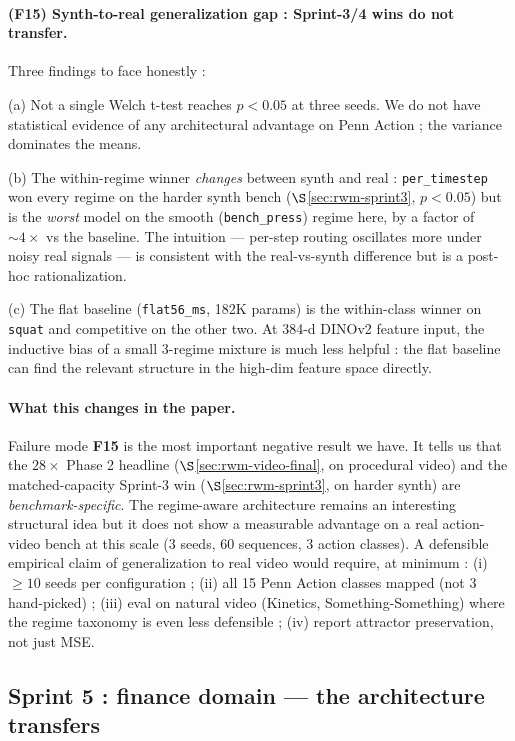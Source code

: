 \documentclass[11pt,a4paper]{article}
\begin{document}
\paragraph{(F15) Synth-to-real generalization gap : Sprint-3/4 wins
do not transfer.} Three findings to face honestly :

(a) Not a single Welch t-test reaches $p{<}0.05$ at three seeds. We
do not have statistical evidence of any architectural advantage on
Penn Action ; the variance dominates the means.

(b) The within-regime winner \emph{changes} between synth and real :
\texttt{per\_timestep} won every regime on the harder synth bench
($\S$\ref{sec:rwm-sprint3}, $p{<}0.05$) but is the \emph{worst} model
on the smooth (\texttt{bench\_press}) regime here, by a factor of
$\sim 4{\times}$ vs the baseline. The intuition --- per-step routing
oscillates more under noisy real signals --- is consistent with the
real-vs-synth difference but is a post-hoc rationalization.

(c) The flat baseline (\texttt{flat56\_ms}, 182K params) is the
within-class winner on \texttt{squat} and competitive on the other
two. At 384-d DINOv2 feature input, the inductive bias of a small
3-regime mixture is much less helpful : the flat baseline can find
the relevant structure in the high-dim feature space directly.

\paragraph{What this changes in the paper.} Failure mode \textbf{F15}
is the most important negative result we have. It tells us that the
$28{\times}$ Phase 2 headline ($\S$\ref{sec:rwm-video-final}, on
procedural video) and the matched-capacity Sprint-3 win
($\S$\ref{sec:rwm-sprint3}, on harder synth) are
\emph{benchmark-specific}. The regime-aware architecture remains an
interesting structural idea but it does not show a measurable
advantage on a real action-video bench at this scale (3 seeds, 60
sequences, 3 action classes). A defensible empirical claim of
generalization to real video would require, at minimum :
(i) $\geq 10$ seeds per configuration ;
(ii) all 15 Penn Action classes mapped (not 3 hand-picked) ;
(iii) eval on natural video (Kinetics, Something-Something) where
the regime taxonomy is even less defensible ;
(iv) report attractor preservation, not just MSE.

\subsection{Sprint 5 : finance domain — the architecture transfers}
\label{sec:rwm-finance}
\end{document}
